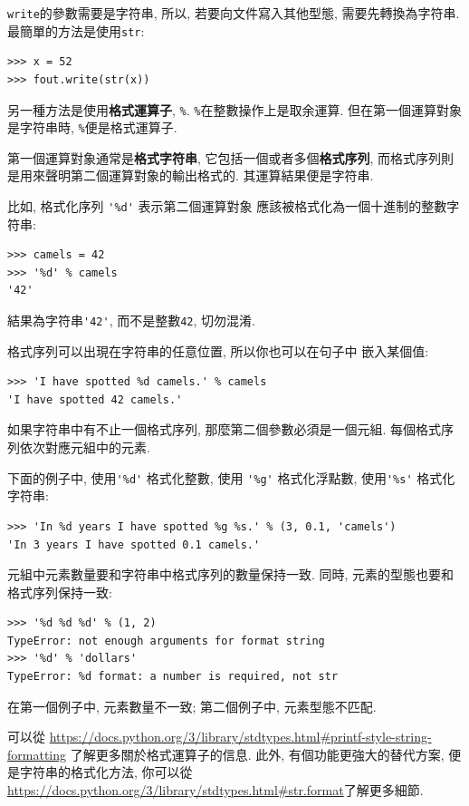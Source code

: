 \documentclass[10pt]{book}
\begin{document}
{\tt write}的參數需要是字符串, 所以, 若要向文件寫入其他型態, 
需要先轉換為字符串. 最簡單的方法是使用{\tt str}:

\begin{verbatim}
>>> x = 52
>>> fout.write(str(x))
\end{verbatim}
%
另一種方法是使用{\bf 格式運算子}, {\tt \%}. 
{\tt \%}在整數操作上是取余運算. 
但在第一個運算對象是字符串時, {\tt \%}便是格式運算子. 

第一個運算對象通常是{\bf 格式字符串}, 它包括一個或者多個{\bf 格式序列}, 
而格式序列則是用來聲明第二個運算對象的輸出格式的. 
其運算結果便是字符串. 

比如, 格式化序列 \verb"'%d'" 表示第二個運算對象
應該被格式化為一個十進制的整數字符串:

\begin{verbatim}
>>> camels = 42
>>> '%d' % camels
'42'
\end{verbatim}
%
結果為字符串\verb"'42'", 而不是整數{\tt 42}, 切勿混淆.

格式序列可以出現在字符串的任意位置, 所以你也可以在句子中
嵌入某個值:

\begin{verbatim}
>>> 'I have spotted %d camels.' % camels
'I have spotted 42 camels.'
\end{verbatim}
%
如果字符串中有不止一個格式序列, 那麼第二個參數必須是一個元組. 
每個格式序列依次對應元組中的元素. 

下面的例子中, 使用\verb"'%d'" 格式化整數, 
使用 \verb"'%g'" 格式化浮點數, 
使用\verb"'%s'" 格式化字符串:

\begin{verbatim}
>>> 'In %d years I have spotted %g %s.' % (3, 0.1, 'camels')
'In 3 years I have spotted 0.1 camels.'
\end{verbatim}
%
元組中元素數量要和字符串中格式序列的數量保持一致. 
同時, 元素的型態也要和格式序列保持一致:

\begin{verbatim}
>>> '%d %d %d' % (1, 2)
TypeError: not enough arguments for format string
>>> '%d' % 'dollars'
TypeError: %d format: a number is required, not str
\end{verbatim}
%
在第一個例子中, 元素數量不一致;
第二個例子中, 元素型態不匹配.

可以從
\url{https://docs.python.org/3/library/stdtypes.html#printf-style-string-formatting}
了解更多關於格式運算子的信息. 
此外, 有個功能更強大的替代方案, 便是字符串的格式化方法, 你可以從
\url{https://docs.python.org/3/library/stdtypes.html#str.format}了解更多細節. 
\end{document}
